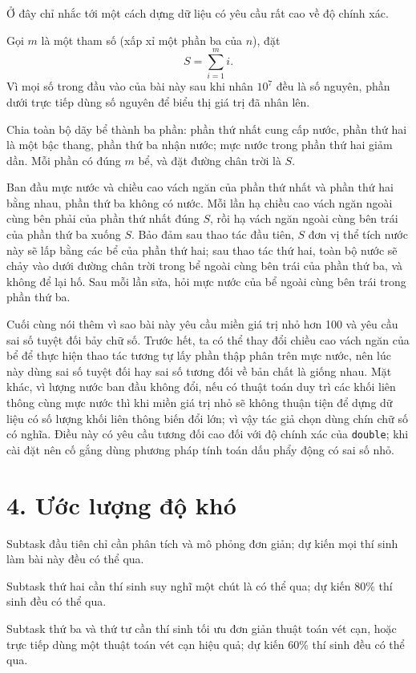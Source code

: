 \documentclass[11pt]{article}
\begin{document}
Ở đây chỉ nhắc tới một cách dựng dữ liệu có yêu cầu rất cao về độ chính xác.

Gọi \(m\) là một tham số (xấp xỉ một phần ba của \(n\)), đặt
\[
  S=\sum_{i=1}^{m} i.
\]
Vì mọi số trong đầu vào của bài này sau khi nhân \(10^7\) đều là số nguyên,
phần dưới trực tiếp dùng số nguyên để biểu thị giá trị đã nhân lên.

Chia toàn bộ dãy bể thành ba phần: phần thứ nhất cung cấp nước, phần thứ hai
là một bậc thang, phần thứ ba nhận nước; mực nước trong phần thứ hai giảm dần.
Mỗi phần có đúng \(m\) bể, và đặt đường chân trời là \(S\).

Ban đầu mực nước và chiều cao vách ngăn của phần thứ nhất và phần thứ hai
bằng nhau, phần thứ ba không có nước. Mỗi lần hạ chiều cao vách ngăn ngoài
cùng bên phải của phần thứ nhất đúng \(S\), rồi hạ vách ngăn ngoài cùng bên
trái của phần thứ ba xuống \(S\). Bảo đảm sau thao tác đầu tiên, \(S\) đơn vị
thể tích nước này sẽ lấp bằng các bể của phần thứ hai; sau thao tác thứ hai,
toàn bộ nước sẽ chảy vào dưới đường chân trời trong bể ngoài cùng bên trái
của phần thứ ba, và không để lại hố. Sau mỗi lần sửa, hỏi mực nước của bể
ngoài cùng bên trái trong phần thứ ba.

Cuối cùng nói thêm vì sao bài này yêu cầu miền giá trị nhỏ hơn 100 và yêu cầu
sai số tuyệt đối bảy chữ số. Trước hết, ta có thể thay đổi chiều cao vách
ngăn của bể để thực hiện thao tác tương tự lấy phần thập phân trên mực nước,
nên lúc này dùng sai số tuyệt đối hay sai số tương đối về bản chất là giống
nhau. Mặt khác, vì lượng nước ban đầu không đổi, nếu có thuật toán duy trì các
khối liên thông cùng mực nước thì khi miền giá trị nhỏ sẽ không thuận tiện để
dựng dữ liệu có số lượng khối liên thông biến đổi lớn; vì vậy tác giả chọn
dùng chín chữ số có nghĩa. Điều này có yêu cầu tương đối cao đối với độ chính
xác của \texttt{double}; khi cài đặt nên cố gắng dùng phương pháp tính toán
dấu phẩy động có sai số nhỏ.

\section*{4. Ước lượng độ khó}

Subtask đầu tiên chỉ cần phân tích và mô phỏng đơn giản; dự kiến mọi thí sinh
làm bài này đều có thể qua.

Subtask thứ hai cần thí sinh suy nghĩ một chút là có thể qua; dự kiến 80\%
thí sinh đều có thể qua.

Subtask thứ ba và thứ tư cần thí sinh tối ưu đơn giản thuật toán vét cạn,
hoặc trực tiếp dùng một thuật toán vét cạn hiệu quả; dự kiến 60\% thí sinh
đều có thể qua.
\end{document}
